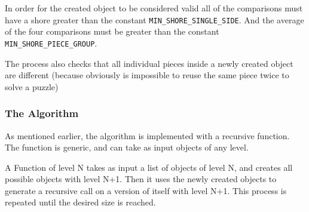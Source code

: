 \documentclass[epsfig,a4paper,11pt,titlepage,twoside,openany]{article}
\begin{document}
In order for the created object to be considered valid all of the comparisons must have a shore greater
than the constant \texttt{MIN\_SHORE\_SINGLE\_SIDE}. And the average of the four comparisons must be greater
than the constant \texttt{MIN\_SHORE\_PIECE\_GROUP}.

The process also checks that all individual pieces inside a newly
created object are different (because obviously is impossible to reuse the same piece twice to solve a puzzle)
\subsubsection{The Algorithm}

As mentioned earlier, the algorithm is implemented with a recursive function.
The function is generic, and can take as input objects of any level.

A Function of level N takes as input a list of objects of level N,
and creates all possible objects with level N+1.
Then it uses the newly created objects to generate a recursive call on a version
of itself with level N+1.
This process is repeated until the desired size is reached.
\end{document}
